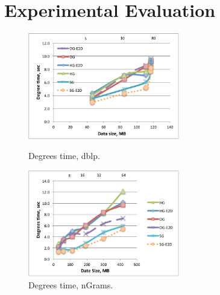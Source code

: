 \section{Experimental Evaluation}
\label{sec:exp}

\begin{figure}[t!]
\centering
\begin{minipage}{3in}
  \centering
  \includegraphics[width=2.6in]{figs/degrees_dblp.pdf}
  \vspace{-0.1in}
  \caption{Degrees time, dblp.}
  \label{fig:deg_dblp}
  \vspace{-0.1in}
\end{minipage}
\begin{minipage}{3in}
  \centering
\includegraphics[width=2.6in]{figs/degrees_ngrams.pdf}
  \vspace{-0.1in}
\caption{Degrees time, nGrams.}
\label{fig:deg_ngrams}
  \vspace{-0.1in}
\end{minipage}
\end{figure}

